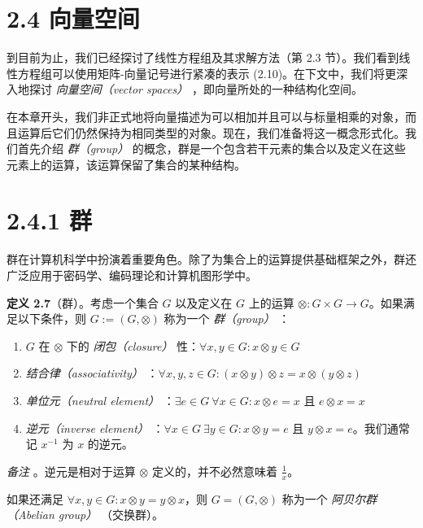 \section*{2.4 向量空间}
\label{sec:2.4}

到目前为止，我们已经探讨了线性方程组及其求解方法（第 2.3 节）。我们看到线性方程组可以使用矩阵-向量记号进行紧凑的表示 (2.10)。在下文中，我们将更深入地探讨 \emph{向量空间（vector spaces）} ，即向量所处的一种结构化空间。

在本章开头，我们非正式地将向量描述为可以相加并且可以与标量相乘的对象，而且运算后它们仍然保持为相同类型的对象。现在，我们准备将这一概念形式化。我们首先介绍 \emph{群（group）} 的概念，群是一个包含若干元素的集合以及定义在这些元素上的运算，该运算保留了集合的某种结构。

\section*{2.4.1 群}

群在计算机科学中扮演着重要角色。除了为集合上的运算提供基础框架之外，群还广泛应用于密码学、编码理论和计算机图形学中。

\textbf{定义 2.7}（群）。考虑一个集合 $ G $ 以及定义在 $ G $ 上的运算 $ \otimes: G \times G \to G $。如果满足以下条件，则 $ G := (G, \otimes) $ 称为一个 \emph{群（group）} ：

\begin{enumerate}
\item $ G $ 在 $ \otimes $ 下的 \emph{闭包（closure）} 性：$ \forall x, y \in G : x \otimes y \in G $
\item \emph{结合律（associativity）} ：$ \forall x, y, z \in G : (x \otimes y) \otimes z = x \otimes (y \otimes z) $
\item \emph{单位元（neutral element）} ：$ \exists e \in G \ \forall x \in G : x \otimes e = x $ 且 $ e \otimes x = x $
\item \emph{逆元（inverse element）} ：$ \forall x \in G \ \exists y \in G : x \otimes y = e $ 且 $ y \otimes x = e $。我们通常记 $ x^{-1} $ 为 $ x $ 的逆元。
\end{enumerate}

\emph{备注} 。逆元是相对于运算 $ \otimes $ 定义的，并不必然意味着 $ \frac{1}{x} $。

如果还满足 $ \forall x, y \in G : x \otimes y = y \otimes x $，则 $ G = (G, \otimes) $ 称为一个 \emph{阿贝尔群（Abelian group）} （交换群）。

